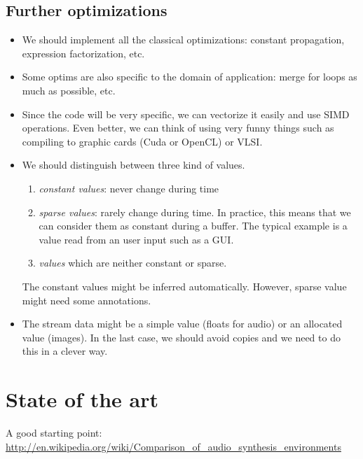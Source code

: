 \documentclass{article}
\begin{document}
\subsection{Further optimizations}
\begin{itemize}
\item We should implement all the classical optimizations: constant propagation,
  expression factorization, etc.
\item Some optims are also specific to the domain of application: merge for
  loops as much as possible, etc.
\item Since the code will be very specific, we can vectorize it easily and use
  SIMD operations. Even better, we can think of using very funny things such as
  compiling to graphic cards (Cuda or OpenCL) or VLSI.
\item We should distinguish between three kind of values.
  \begin{enumerate}
  \item \emph{constant values}: never change during time
  \item \emph{sparse values}: rarely change during time. In practice, this means
    that we can consider them as constant during a buffer. The typical example
    is a value read from an user input such as a GUI.
  \item \emph{values} which are neither constant or sparse.
  \end{enumerate}
  The constant values might be inferred automatically. However, sparse value
  might need some annotations.
\item The stream data might be a simple value (floats for audio) or an allocated
  value (images). In the last case, we should avoid copies and we need to do
  this in a clever way.
\end{itemize}

\section{State of the art}
A good starting point:
\url{http://en.wikipedia.org/wiki/Comparison_of_audio_synthesis_environments}

\end{document}
